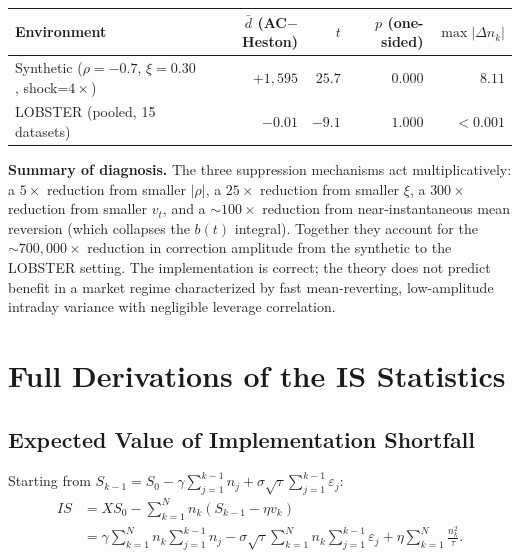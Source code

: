 \documentclass[11pt]{article}
\begin{document}
\begin{center}
\begin{tabular}{lrrrr}
\toprule
Environment & $\bar{d}$ (AC$-$Heston) & $t$ & $p$ (one-sided) & $\max|\Delta n_k|$ \\
\midrule
Synthetic ($\rho=-0.7$, $\xi=0.30$, shock=$4\times$) & $+1{,}595$ & $25.7$ & $0.000$ & $8.11$ \\
LOBSTER (pooled, 15 datasets) & $-0.01$  & $-9.1$ & $1.000$ & $<0.001$ \\
\bottomrule
\end{tabular}
\label{tab:synthetic_results}
\end{center}

\noindent
\textbf{Summary of diagnosis.}
The three suppression mechanisms act multiplicatively:
a $5\times$ reduction from smaller $|\rho|$,
a $25\times$ reduction from smaller $\xi$,
a $300\times$ reduction from smaller $v_t$,
and a $\sim 100\times$ reduction from near-instantaneous mean reversion
(which collapses the $b(t)$ integral).
Together they account for the $\sim 700{,}000\times$ reduction in correction amplitude
from the synthetic to the LOBSTER setting. The implementation is correct; the theory
does not predict benefit in a market regime characterized by fast mean-reverting,
low-amplitude intraday variance with negligible leverage correlation.

\appendix

\section{Full Derivations of the IS Statistics}
\label{app:derivations}

\subsection{Expected Value of Implementation Shortfall}

Starting from $S_{k-1}=S_0-\gamma\sum_{j=1}^{k-1}n_j+\sigma\sqrt{\tau}\sum_{j=1}^{k-1}\varepsilon_j$:
\begin{align*}
IS &= XS_0 - \sum_{k=1}^Nn_k(S_{k-1}-\eta v_k)\\
&= \gamma\sum_{k=1}^Nn_k\sum_{j=1}^{k-1}n_j
   - \sigma\sqrt{\tau}\sum_{k=1}^Nn_k\sum_{j=1}^{k-1}\varepsilon_j
   + \eta\sum_{k=1}^N\frac{n_k^2}{\tau}.
\end{align*}
\end{document}

